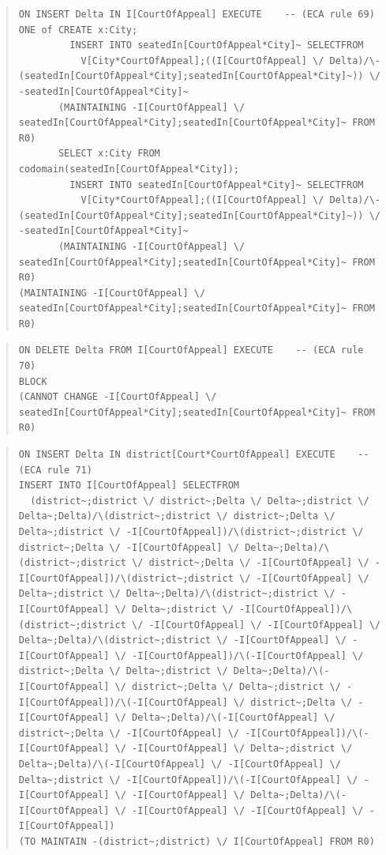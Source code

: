 \documentclass[10pt,a4paper]{report}              %
\theoremstyle{plain}\theorembodyfont{\rmfamily}\newtheorem{definition}{Definition}[section]
\theoremstyle{plain}\theorembodyfont{\rmfamily}\newtheorem{designrule}[definition]{Requirement}
\begin{document}
\begin{quote}
\begin{verbatim}
ON INSERT Delta IN I[CourtOfAppeal] EXECUTE    -- (ECA rule 69)
ONE of CREATE x:City;
         INSERT INTO seatedIn[CourtOfAppeal*City]~ SELECTFROM
           V[City*CourtOfAppeal];((I[CourtOfAppeal] \/ Delta)/\-(seatedIn[CourtOfAppeal*City];seatedIn[CourtOfAppeal*City]~)) \/ -seatedIn[CourtOfAppeal*City]~
       (MAINTAINING -I[CourtOfAppeal] \/ seatedIn[CourtOfAppeal*City];seatedIn[CourtOfAppeal*City]~ FROM R0)
       SELECT x:City FROM codomain(seatedIn[CourtOfAppeal*City]);
         INSERT INTO seatedIn[CourtOfAppeal*City]~ SELECTFROM
           V[City*CourtOfAppeal];((I[CourtOfAppeal] \/ Delta)/\-(seatedIn[CourtOfAppeal*City];seatedIn[CourtOfAppeal*City]~)) \/ -seatedIn[CourtOfAppeal*City]~
       (MAINTAINING -I[CourtOfAppeal] \/ seatedIn[CourtOfAppeal*City];seatedIn[CourtOfAppeal*City]~ FROM R0)
(MAINTAINING -I[CourtOfAppeal] \/ seatedIn[CourtOfAppeal*City];seatedIn[CourtOfAppeal*City]~ FROM R0)
\end{verbatim}
\end{quote}
\begin{quote}
\begin{verbatim}
ON DELETE Delta FROM I[CourtOfAppeal] EXECUTE    -- (ECA rule 70)
BLOCK
(CANNOT CHANGE -I[CourtOfAppeal] \/ seatedIn[CourtOfAppeal*City];seatedIn[CourtOfAppeal*City]~ FROM R0)
\end{verbatim}
\end{quote}
\begin{quote}
\begin{verbatim}
ON INSERT Delta IN district[Court*CourtOfAppeal] EXECUTE    -- (ECA rule 71)
INSERT INTO I[CourtOfAppeal] SELECTFROM
  (district~;district \/ district~;Delta \/ Delta~;district \/ Delta~;Delta)/\(district~;district \/ district~;Delta \/ Delta~;district \/ -I[CourtOfAppeal])/\(district~;district \/ district~;Delta \/ -I[CourtOfAppeal] \/ Delta~;Delta)/\(district~;district \/ district~;Delta \/ -I[CourtOfAppeal] \/ -I[CourtOfAppeal])/\(district~;district \/ -I[CourtOfAppeal] \/ Delta~;district \/ Delta~;Delta)/\(district~;district \/ -I[CourtOfAppeal] \/ Delta~;district \/ -I[CourtOfAppeal])/\(district~;district \/ -I[CourtOfAppeal] \/ -I[CourtOfAppeal] \/ Delta~;Delta)/\(district~;district \/ -I[CourtOfAppeal] \/ -I[CourtOfAppeal] \/ -I[CourtOfAppeal])/\(-I[CourtOfAppeal] \/ district~;Delta \/ Delta~;district \/ Delta~;Delta)/\(-I[CourtOfAppeal] \/ district~;Delta \/ Delta~;district \/ -I[CourtOfAppeal])/\(-I[CourtOfAppeal] \/ district~;Delta \/ -I[CourtOfAppeal] \/ Delta~;Delta)/\(-I[CourtOfAppeal] \/ district~;Delta \/ -I[CourtOfAppeal] \/ -I[CourtOfAppeal])/\(-I[CourtOfAppeal] \/ -I[CourtOfAppeal] \/ Delta~;district \/ Delta~;Delta)/\(-I[CourtOfAppeal] \/ -I[CourtOfAppeal] \/ Delta~;district \/ -I[CourtOfAppeal])/\(-I[CourtOfAppeal] \/ -I[CourtOfAppeal] \/ -I[CourtOfAppeal] \/ Delta~;Delta)/\(-I[CourtOfAppeal] \/ -I[CourtOfAppeal] \/ -I[CourtOfAppeal] \/ -I[CourtOfAppeal])
(TO MAINTAIN -(district~;district) \/ I[CourtOfAppeal] FROM R0)
\end{verbatim}
\end{quote}
\end{document}
